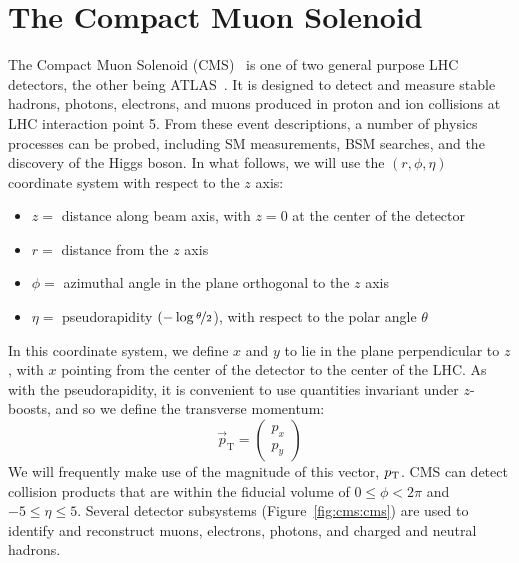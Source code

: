 \section{The Compact Muon Solenoid}

The Compact Muon Solenoid (CMS)~\cite{cmsjinst} is one of two general purpose LHC detectors, the other being ATLAS~\cite{atlasjinst}.
It is designed to detect and measure stable hadrons, photons, electrons, and muons produced in proton and ion collisions at LHC interaction point 5. 
From these event descriptions, a number of physics processes can be probed, including SM measurements, BSM searches, and the discovery of the Higgs boson. 
In what follows, we will use the $(r,\phi,\eta)$ coordinate system with respect to the $z$ axis:
\begin{itemize}
    \setlength\itemsep{1pt}
    \item $z = $ distance along beam axis, with $z=0$ at the center of the detector
    \item $r = $ distance from the $z$ axis
    \item $\phi = $ azimuthal angle in the plane orthogonal to the $z$ axis
    \item $\eta = $ pseudorapidity $(-\log\nicefrac{\theta}{2}$), with respect to the polar angle $\theta$ 
\end{itemize}
In this coordinate system, we define $x$ and $y$ to lie in the plane perpendicular to $z$, with $x$ pointing from the center of the detector to the center of the LHC.
As with the pseudorapidity, it is convenient to use quantities invariant under $z$-boosts, and so we define the transverse momentum:
\begin{equation}
    \vec{p}_\mathrm{T} = \left(\begin{matrix} p_x \\ p_y \end{matrix}\right)
\end{equation}
We will frequently make use of the magnitude of this vector, $p_\mathrm{T}$. 
CMS can detect collision products that are within the fiducial volume of $0 \leq \phi < 2\pi$ and $-5 \leq \eta\leq 5$. 
Several detector subsystems (Figure~\ref{fig:cms:cms}) are used to identify and reconstruct muons, electrons, photons, and charged and neutral hadrons. 

